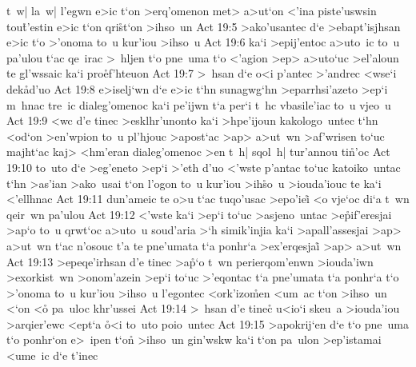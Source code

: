 t~w|
la~w|
l'egwn
e>ic
t`on
>erq'omenon
met>
a>ut`on
<'ina
piste'uswsin
tou\r{t}'estin
e>ic
t`on
qri\r{s}t`on
>ihso~un\bibvsend
\vs Act 19:5
>ako'usantec
d`e
>ebapt'isjhsan
e>ic
t`o
>'onoma
to~u
kur'iou
>ihso~u\bibvsend
\vs Act 19:6
ka`i
>epij'entoc
a>uto~ic
to~u
pa'ulou
t`ac
qe~irac
>~hljen
t`o
pne~uma
t`o
<'agion
>ep>
a>uto`uc
>el'aloun
te
gl'wssaic
ka`i
pro\r{e}f'hteuon\bibvsend
{}
\vs Act 19:7
>~hsan
d`e
o<i
p'antec
>'andrec
<wse`i
dek\r{a}d'uo\bibvsend
{}
\vs Act 19:8
e>iselj`wn
d`e
e>ic
t`hn
sunagwg`hn
>eparrhsi'azeto
>ep`i
m~hnac
tre~ic
dialeg'omenoc
ka`i
pe'ijwn
t`a
per`i
t~hc
vbasile'iac
to~u
vjeo~u\bibvsend
\vs Act 19:9
<wc
d'e
tinec
>esklhr'unonto
ka`i
>hpe'ijoun
kakologo~untec
t`hn
<od`on
>en'wpion
to~u
pl'hjouc
>apost`ac
>ap>
a>ut~wn
>af'wrisen
to`uc
majht`ac
kaj>
<hm'eran
dialeg'omenoc
>en
t~h|
sqol~h|
tur'annou
ti\r{n}'oc\bibvsend
{}
\vs Act 19:10
to~uto
d`e
>eg'eneto
>ep`i
>'eth
d'uo
<'wste
p'antac
to`uc
katoiko~untac
t`hn
>as'ian
>ako~usai
t`on
l'ogon
to~u
kur'iou
>ih\r{s}o~u
>iouda'iouc
te
ka`i
<'ellhnac\bibvsend
\vs Act 19:11
dun'ameic
te
o>u
t`ac
tuqo'usac
>epo'iei\r{}
<o
vje`oc
di`a
t~wn
qeir~wn
pa'ulou\bibvsend
\vs Act 19:12
<'wste
ka`i
>ep`i
to`uc
>asjeno~untac
>e\r{p}if'eresjai
>ap`o
to~u
qrwt`oc
a>uto~u
soud'aria
>`h
simik'injia
ka`i
>apall'assesjai
>ap>
a>ut~wn
t`ac
n'osouc
t'a
te
pne'umata
t`a
ponhr`a
>ex'erqesjai\r{}
>ap>
a>ut~wn\bibvsend
\vs Act 19:13
>epeqe'irhsan
d'e
tinec
>a\r{p}`o
t~wn
perierqom'enwn
>iouda'iwn
>exorkist~wn
>onom'azein
>ep`i
to`uc
>'eqontac
t`a
pne'umata
t`a
ponhr`a
t`o
>'onoma
to~u
kur'iou
>ihso~u
l'egontec
<ork'izo\r{m}en
<um~ac
t`on
>ihso~un
<`on
<o\r{}
pa~uloc
khr'ussei\bibvsend
\vs Act 19:14
>~hsan
d'e
tinec\r{}
u<io`i
skeu~a
>iouda'iou
>arqier'ewc
<ept`a
\r{o}<i
to~uto
poio~untec\bibvsend
\vs Act 19:15
>apokrij`en
d`e
t`o
pne~uma
t`o
ponhr`on
e>~ipen
t`on\r{}
>ihso~un
gin'wskw
ka`i
t`on
pa~ulon
>ep'istamai
<ume~ic
d`e
t'inec
